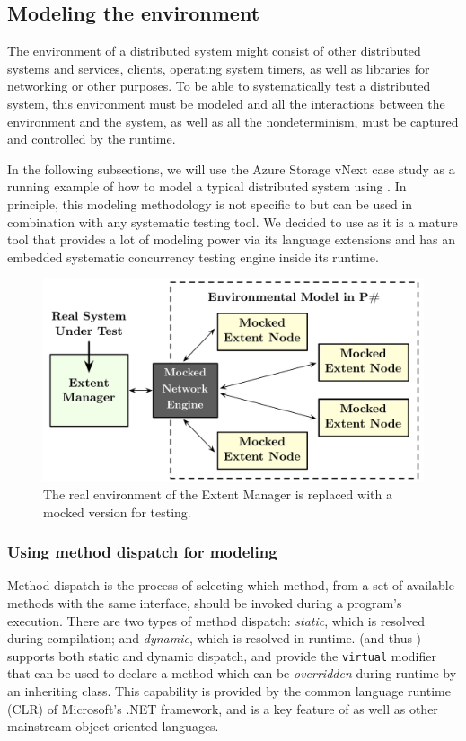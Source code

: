 \subsection{Modeling the environment}
\label{sec:method:model}

The environment of a distributed system might consist of other distributed systems and services, clients, operating system timers, as well as libraries for networking or other purposes. To be able to systematically test a distributed system, this environment must be modeled and all the interactions between the environment and the system, as well as all the nondeterminism, must be captured and controlled by the \psharp runtime.

In the following subsections, we will use the Azure Storage vNext case study as a running example of how to model a typical distributed system using \psharp. In principle, this modeling methodology is not specific to \psharp but can be used in combination with any systematic testing tool. We decided to use \psharp as it is a mature tool that provides a lot of modeling power via its \csharp language extensions and has an embedded systematic concurrency testing engine inside its runtime.

\begin{figure}[t]
\centering
\includegraphics[width=\linewidth]{img/mocked_engine}
\caption{The real environment of the Extent Manager is replaced with a mocked version for testing.}
\label{fig:azurestoremodel}
\end{figure}

\subsubsection{Using method dispatch for modeling}
\label{sec:method:model:dd}

Method dispatch is the process of selecting which method, from a set of available methods with the same interface, should be invoked during a program's execution. There are two types of method dispatch: \emph{static}, which is resolved during compilation; and \emph{dynamic}, which is resolved in runtime.  \csharp (and thus \psharp) supports both static and dynamic dispatch, and provide the \texttt{virtual} modifier that can be used to declare a method which can be \emph{overridden} during runtime by an inheriting class. This capability is provided by the common language runtime (CLR) of Microsoft's .NET framework, and is a key feature of \csharp as well as other mainstream object-oriented languages.

